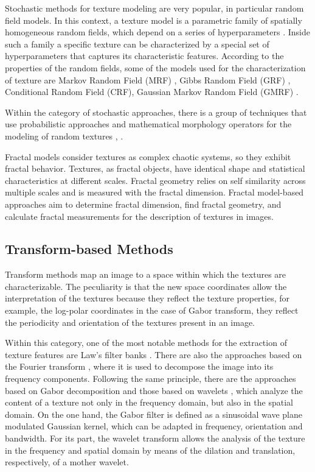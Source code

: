 Stochastic methods for texture modeling are very popular, in particular random field models. In this context, a texture model is a parametric family of spatially homogeneous random fields, which depend on a series of hyperparameters \citep{Winkler:Book:2003}. Inside such a family a specific texture can be characterized by a special set of hyperparameters that captures its characteristic features. According to the properties of the random fields, some of the models used for the characterization of texture are Markov Random Field (MRF) \citep{Hassner.Sklansky:CGIM:1980, Cross.Jain:PAMI:1983}, Gibbs Random Field (GRF) \citep{Derin.Cole:CVGIM:1986}, Conditional Random Field (CRF), Gaussian Markov Random Field (GMRF) \citep{Cohen.Fan.ea:PAMI:1991}.

Within the category of stochastic approaches, there is a group of techniques that use probabilistic approaches and mathematical morphology operators for the modeling of random textures \citep{Serra:CGIM:1980}, \citep{Cord.Bach.ea:JoM:2010}.

Fractal models consider textures as complex chaotic systems, so they exhibit fractal behavior. Textures, as fractal objects, have identical shape and statistical characteristics at different scales. Fractal geometry relies on self similarity across multiple scales and is measured with the fractal dimension. Fractal model-based approaches aim to determine fractal dimension, find fractal geometry, and calculate fractal measurements for the description of textures in images.


\subsection{Transform-based Methods}
Transform methods map an image to a space within which the textures are characterizable. The peculiarity is that the new space coordinates allow the interpretation of the textures because they reflect the texture properties, for example, the log-polar coordinates in the case of Gabor transform, they reflect the periodicity and orientation of the textures present in an image.

Within this category, one of the most notable methods for the extraction of texture features are Law's filter banks \citep{Laws:IUW:1979, Laws:IPMG:1980, Laws:Report:1980}. There are also the approaches based on the Fourier transform \citep{Ursani.Kpalma.ea:ICMV:2007}, where it is used to decompose the image into its frequency components. Following the same principle, there are the approaches based on Gabor decomposition \citep{Gabor:JIEE:1946} and those based on wavelets \citep{Arivazhagan.Ganesan:PR:2003}, which analyze the content of a texture not only in the frequency domain, but also in the spatial domain. On the one hand, the Gabor filter is defined as a sinusoidal wave plane modulated Gaussian kernel, which can be adapted in frequency, orientation and bandwidth. For its part, the wavelet transform allows the analysis of the texture in the frequency and spatial domain by means of the dilation and translation, respectively, of a mother wavelet.

